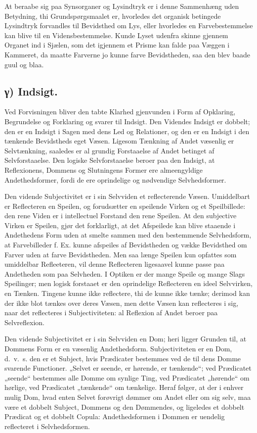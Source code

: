 \documentclass[12pt]{book}
\newcommand{\opage}[1]{\marginnote{\footnotesize\textit{[#1]}}}
\begin{document}
At beraabe sig paa Synsorganer og Lysindtryk er i denne Sammenhæng
uden Betydning, thi Grundspørgsmaalet er, hvorledes det organisk
betingede Lysindtryk forvandles til Bevidsthed om Lys, eller
hvorledes en Farvebestemmelse kan blive til en Vidensbestemmelse.
Kunde Lyset udenfra skinne gjennem Organet ind i Sjælen, som det
igjennem et Prisme kan falde paa Væggen i Kammeret, da maatte
Farverne jo kunne farve Bevidstheden, saa den blev baade guul og
blaa.

\subsection*{γ) Indsigt.}

Ved Forvisningen bliver den tabte Klarhed gjenvunden i Form af
Opklaring, Begrundelse og Forklaring og svarer til Indsigt. Den
Videndes Indsigt er dobbelt; den er en Indsigt i Sagen med dens Led
og Relationer, og den er en Indsigt i den tænkende Bevidstheds eget
Væsen. Ligesom Tænkning af Andet væsenlig er Selvtænkning, saaledes
er al grundig Forstaaelse af Andet betinget af Selvforstaaelse. Den
logiske Selvforstaaelse beroer paa den Indsigt, at Reflexionens,
Dommens og Slutningens
\opage{4} %
Former ere almeengyldige Andethedsformer, fordi de ere oprindelige
og nødvendige Selvhedsformer.

Den vidende Subjectivitet er i sin Selvviden et reflecterende Væsen.
Umiddelbart er Reflecteren en Speilen, og forudsætter en speilende
Virken og et Speilbillede: den rene Viden er i intellectuel Forstand
den rene Speilen. At den subjective Virken er Speilen, gjør det
forklarligt, at det Afspeilede kan blive staaende i Andethedens Form
uden at smelte sammen med den bestemmende Selvhedsform, at
Farvebilleder f. Ex. kunne afspeiles af Bevidstheden og vække
Bevidsthed om Farver uden at farve Bevidstheden. Men saa længe
Speilen kun opfattes som umiddelbar
Refleeteren, vil denne Reflecteren ligesaavel kunne passe paa
Andetheden som paa Selvheden. I Optiken er der mange Speile og mange
Slags Speilinger; men logisk forstaaet er den oprindelige Reflecteren
en ideel Selvvirken, en Tænken. Tingene kunne ikke reflectere, thi de
kunne ikke tænke; derimod kan der ikke blot tænkes over deres Væsen,
men dette Væsen kan reflecteres i sig, naar det reflecteres i
Subjectiviteten: al Reflexion af Andet beroer paa Selvreflexion.

Den vidende Subjectivitet er i sin Selvviden en Dom; heri ligger
Grunden til, at Dommens Form er en væsenlig Andethedsform.
Subjectiviteten er en Dom, d.~v.~s. den er et Subject, hvis
Prædicater bestemmes ved de til dens Domme svarende Functioner.
„Selvet er seende, er hørende, er tænkende“; ved Prædicatet „seende“
bestemmes alle Domme om synlige Ting, ved Prædicatet „hørende“ om
hørlige, ved Prædicatet „tænkende“ om tænkelige. Heraf følger, at der
i enhver mulig Dom, hvad enten Selvet forøvrigt dømmer om Andet eller
om sig selv, maa være et dobbelt Subject, Dommens og den Dømmendes,
og ligeledes et dobbelt Prædicat og et dobbelt Copula:
Andethedsformen i Dommen er uendelig reflecteret i Selvhedsformen.
\end{document}
